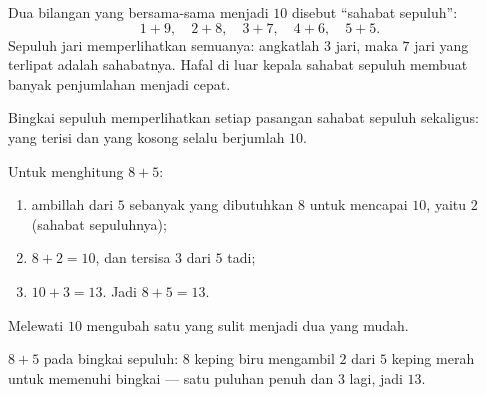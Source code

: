 \begin{example}\label{ex:g1:addition:friends}
Dua bilangan yang bersama-sama menjadi $10$ disebut ``sahabat sepuluh'':
\[
1 + 9, \quad 2 + 8, \quad 3 + 7, \quad 4 + 6, \quad 5 + 5 .
\]
Sepuluh jari memperlihatkan semuanya: angkatlah $3$ jari, maka $7$
jari yang terlipat adalah sahabatnya. Hafal di luar kepala sahabat
sepuluh membuat banyak penjumlahan menjadi cepat.
\end{example}

\begin{omfigure}

{\small Bingkai sepuluh memperlihatkan setiap pasangan sahabat sepuluh
sekaligus: yang terisi dan yang kosong selalu berjumlah $10$.}
\end{omfigure}

\begin{method}\label{met:g1:addition:crossten}
Untuk menghitung $8 + 5$:
\begin{enumerate}
  \item ambillah dari $5$ sebanyak yang dibutuhkan $8$ untuk mencapai
        $10$, yaitu $2$ (sahabat sepuluhnya);
  \item $8 + 2 = 10$, dan tersisa $3$ dari $5$ tadi;
  \item $10 + 3 = 13$. Jadi $8 + 5 = 13$.
\end{enumerate}
Melewati $10$ mengubah satu  yang sulit menjadi dua yang mudah.
\end{method}

\begin{omfigure}

{\small $8 + 5$ pada bingkai sepuluh: $8$ keping biru mengambil $2$
dari $5$ keping merah untuk memenuhi bingkai --- satu puluhan penuh
dan $3$ lagi, jadi $13$.}
\end{omfigure}


